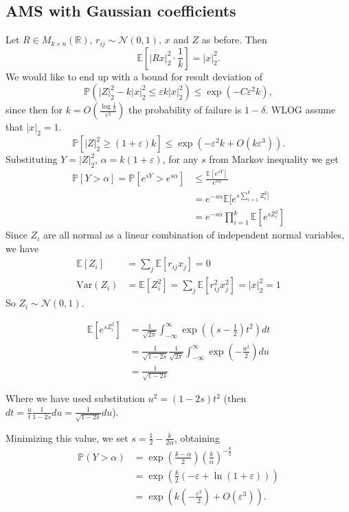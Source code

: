 \documentclass[11pt]{article}
\newcommand{\var}{\mathrm{Var}}
\begin{document}
\subsection{AMS with Gaussian coefficients}
Let $R \in M_{k \times n}(\mathbb{R})$, $r_{ij} \sim \mathcal{N}(0, 1)$, $x$ and $Z$ as before. Then
$$ \mathbb{E} \left[|Rx|_2^2 \cdot \frac{1}{k} \right] = |x|_2^2.$$
We would like to end up with a bound for result deviation of
$$ \mathbb{P}(|Z|_2^2 - k|x|_2^2 \leq \varepsilon k|x|_2^2) \leq \exp(-C \varepsilon^2 k),$$
since then for $k = O \left( \frac{\log \frac{1}{\delta}}{\varepsilon^2}\right)$ the probability of failure is $1 - \delta$.
WLOG assume that $|x|_2 = 1$.
$$ \mathbb{P}[|Z|_2^2 \geq (1+\varepsilon) k] \leq \exp (-\varepsilon^2 k + O(k\varepsilon^3)). $$
Substituting $Y = |Z|_2^2$, $\alpha = k(1+\varepsilon)$, for any $s$ from Markov inequality we get
\begin{align*}
    \mathbb{P}[Y > \alpha] = \mathbb{P}[e^{sY} > e^{s\alpha}] &\leq \frac{\mathbb{E}[e^{sY}]}{e^{s\alpha}} \\
    &= e^{-s\alpha} \mathbb{E}[e^{s \sum_{i=1}^k Z_i^2]} \\
    &= e^{-s\alpha} \prod _{i=1}^k\mathbb{E}[e^{s Z_i^2}]
\end{align*}
Since $Z_i$ are all normal as a linear combination of independent normal variables, we have
\begin{align*}
    \mathbb{E}[Z_i] &= \sum_j \mathbb{E}[r_{ij} x_j] = 0 \\
    \var(Z_i) &= \mathbb{E}[Z_i^2] = \sum_j \mathbb{E}[r_{ij}^2 x_j^2] = |x|_2^2 = 1
\end{align*}
So $Z_i \sim \mathcal{N}(0,1)$.

\begin{align*}
\mathbb{E}[e^{sZ_i^2}] &= \frac{1}{ \sqrt{2 \pi}}\int_{-\infty}^{\infty} \exp \left((s-\frac{1}{2})t^{2}\right) dt \\ 
&= \frac{1}{\sqrt{1-2s}} \frac{1}{ \sqrt{2 \pi}}\int_{-\infty}^{\infty} \exp \left(-\frac{u^2}{2}\right) du \\
&= \frac{1}{\sqrt{1-2s}}
\end{align*}

Where we have used substitution $u^2 = (1-2s)t^2$ (then $dt = \frac{u}{t}\frac{1}{1-2s}du = \frac{1}{\sqrt{1-2s}}du$).


Minimizing this value, we set $s = \frac{1}{2} - \frac{k}{2 \alpha}$, obtaining
\begin{align*}
\mathbb{P}(Y > \alpha) &= \exp(\frac{k-\alpha}{2}) \left( \frac{k}{\alpha} \right)^{-\frac{k}{2}} \\
&= \exp(\frac{k}{2}(-\varepsilon +  \ln(1+\varepsilon))) \\
&= \exp(k(-\frac{\varepsilon^2}{2}) + O(\varepsilon^3)).
\end{align*}
\end{document}
